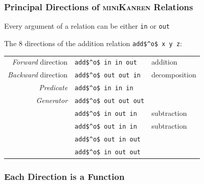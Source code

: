 \documentclass[xcolor=table]{beamer}
\newcommand{\mk}{\textsc{miniKanren}\xspace}
\begin{document}
\begin{frame}[fragile]
  \frametitle{Principal Directions of \mk Relations}
\begin{center}
  Every argument of a relation can be either \lstinline{in} or \lstinline{out}
\end{center}

\vfill

\begin{center}
  The 8 directions of the addition relation \lstinline{add$^o$ x y z}:
\end{center}

\begin{center}
\begin{tabular}{rll}
  \emph{Forward} direction  & \lstinline|add$^o$ in in out|   & addition      \\
  \emph{Backward} direction & \lstinline|add$^o$ out out in|  & decomposition \\
  \emph{Predicate}          & \lstinline|add$^o$ in in in|    &               \\
  \emph{Generator}          & \lstinline|add$^o$ out out out| &               \\
                            & \lstinline|add$^o$ in out in|   & subtraction   \\
                            & \lstinline|add$^o$ out in in|   & subtraction   \\
                            & \lstinline|add$^o$ out in out|  &               \\
                            & \lstinline|add$^o$ in out out|  &
\end{tabular}
\end{center}
\end{frame}


\begin{frame}[fragile]
  \frametitle{Each Direction is a Function}
\end{frame}
\end{document}
